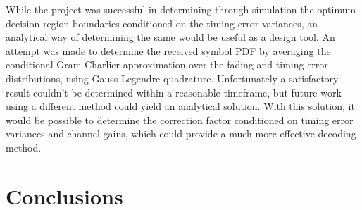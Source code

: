 While the project was successful in determining through simulation the optimum decision region boundaries conditioned on the timing error variances, an analytical way of determining the same would be useful as a design tool. An attempt was made to determine the received symbol PDF by averaging the conditional Gram-Charlier approximation over the fading and timing error distributions, using Gauss-Legendre quadrature. Unfortunately a satisfactory result couldn't be determined within a reasonable timeframe, but future work using a different method could yield an analytical solution. With this solution, it would be possible to determine the correction factor conditioned on timing error variances and channel gains, which could provide a much more effective decoding method.

\chapter{Conclusions}




